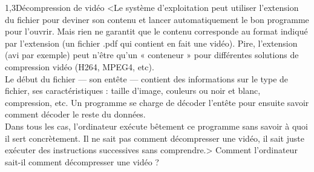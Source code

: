 \begin{quiz}[title={Compression de données}]
\begin{quizquestion*}[c]{2}{1,3}{Décompression de vidéo}
<Le système d'exploitation peut utiliser l'extension du fichier pour deviner son contenu et lancer automatiquement le bon programme pour l'ouvrir. Mais rien ne garantit que le contenu corresponde au format indiqué par l'extension (un fichier .pdf qui contient en fait une vidéo). Pire, l'extension (avi par exemple) peut n'être qu'un  « conteneur » pour différentes solutions de compression vidéo (H264, MPEG4, etc).\\
Le début du fichier --- son entête --- contient des informations sur le type de fichier, ses caractéristiques : taille d'image, couleurs ou noir et blanc, compression, etc. Un programme se charge de décoder l'entête pour ensuite savoir comment décoder le reste du données.\\
Dans tous les cas, l'ordinateur exécute bêtement ce programme sans savoir à quoi il sert concrètement. Il ne sait pas comment décompresser une vidéo, il sait juste exécuter des instructions successives sans comprendre.>
Comment l'ordinateur sait-il comment décompresser une vidéo ? 
\end{quizquestion*}
\end{quiz}


